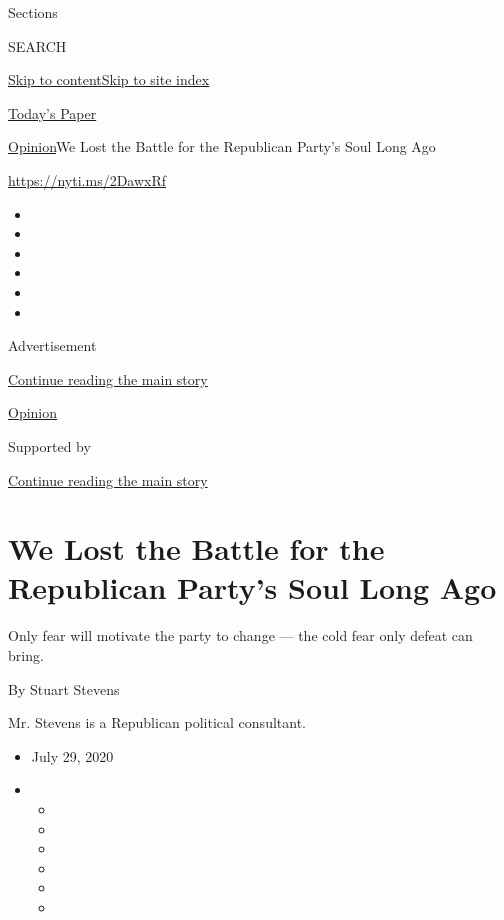 Sections

SEARCH

\protect\hyperlink{site-content}{Skip to
content}\protect\hyperlink{site-index}{Skip to site index}

\href{https://myaccount.nytimes3xbfgragh.onion/auth/login?response_type=cookie\&client_id=vi}{}

\href{https://www.nytimes3xbfgragh.onion/section/todayspaper}{Today's
Paper}

\href{/section/opinion}{Opinion}\textbar{}We Lost the Battle for the
Republican Party's Soul Long Ago

\url{https://nyti.ms/2DawxRf}

\begin{itemize}
\item
\item
\item
\item
\item
\item
\end{itemize}

Advertisement

\protect\hyperlink{after-top}{Continue reading the main story}

\href{/section/opinion}{Opinion}

Supported by

\protect\hyperlink{after-sponsor}{Continue reading the main story}

\hypertarget{we-lost-the-battle-for-the-republican-partys-soul-long-ago}{%
\section{We Lost the Battle for the Republican Party's Soul Long
Ago}\label{we-lost-the-battle-for-the-republican-partys-soul-long-ago}}

Only fear will motivate the party to change --- the cold fear only
defeat can bring.

By Stuart Stevens

Mr. Stevens is a Republican political consultant.

\begin{itemize}
\item
  July 29, 2020
\item
  \begin{itemize}
  \item
  \item
  \item
  \item
  \item
  \item
  \end{itemize}
\end{itemize}

